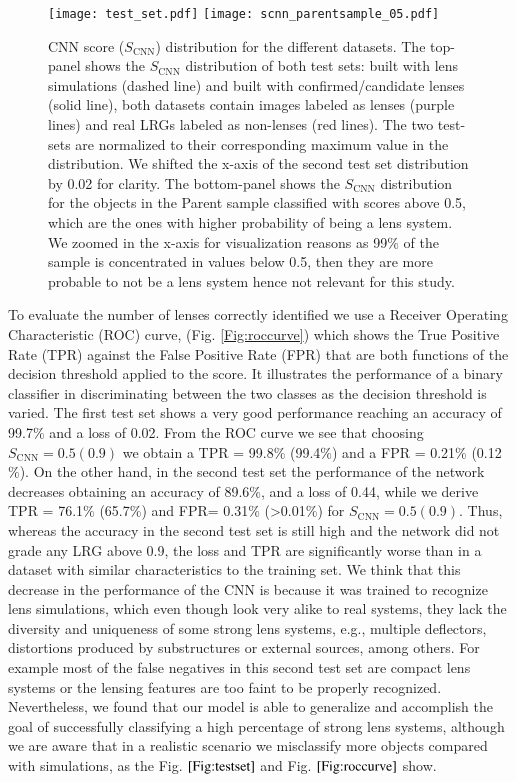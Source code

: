 \documentclass[tradiabstract,twocolumn]{aa}
\begin{document}
\begin{figure}[t!]
\centering
\texttt{[image: test\_set.pdf]}
\texttt{[image: scnn\_parentsample\_05.pdf]}
\caption{CNN score ($S_{\text{CNN}}$) distribution for the different datasets.  The top-panel shows the $S_{\text{CNN}}$ distribution of both test sets: built with lens simulations (dashed line) and built with confirmed/candidate lenses (solid line), both datasets contain images labeled as lenses (purple lines) and real LRGs labeled as non-lenses (red lines). The two test-sets are normalized to their corresponding maximum value in the distribution. We shifted the x-axis of the second test set distribution by 0.02 for clarity. The bottom-panel shows the $S_{\text{CNN}}$ distribution for the objects in the Parent sample classified with scores above 0.5, which are the ones with  higher probability of being a lens system. We zoomed in the x-axis for visualization reasons as 99$\%$ of the sample is concentrated in values below 0.5, then they are more probable to not be a lens system hence not relevant for this study. }
\label{Fig:testset}
\end{figure}


To evaluate the number of lenses correctly identified we use a Receiver Operating Characteristic (ROC) curve, (Fig. \ref{Fig:roccurve}) which shows the True Positive Rate (TPR) against the False Positive Rate (FPR) that are both functions of the decision threshold applied to the score. It illustrates the performance of a binary classifier in discriminating between the two classes as the decision threshold is varied. The first test set shows a very good performance reaching an accuracy of 99.7$\%$ and a loss of 0.02. From the ROC curve we see that choosing $S_{\text{CNN}} = 0.5 (0.9)$ we obtain a TPR = 99.8$\%$ (99.4$\%$) and a FPR = 0.21$\%$ (0.12$\%$). On the other hand, in the second test set the performance of the network decreases obtaining an accuracy of 89.6$\%$, and a loss of 0.44, while we derive TPR = 76.1$\%$ (65.7$\%$) and FPR= 0.31$\%$ (>0.01$\%$) for $S_{\text{CNN}} = 0.5 (0.9)$. Thus, whereas the accuracy in the second test set is still high and the network did not grade any LRG above 0.9, the loss and TPR are significantly worse than in a dataset with similar characteristics to the training set. We think that this decrease in the performance of the CNN is because it was trained to recognize lens simulations, which even though look very alike to real systems, they lack the diversity and uniqueness of some strong lens systems, e.g., multiple deflectors, distortions produced by substructures or external sources, among others. For example most of the false negatives in this second test set are compact lens systems or the lensing features are too faint to be properly recognized. Nevertheless, we found that our model is able to generalize and accomplish the goal of successfully classifying a high percentage of strong lens systems, although we are aware that in a realistic scenario we misclassify more objects compared with simulations, as the Fig. $\ref{Fig:testset}$ and Fig. $\ref{Fig:roccurve}$ show. 
\end{document}
